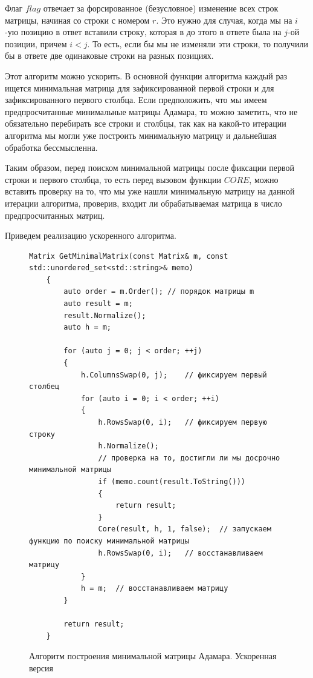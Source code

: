 \documentclass[a4paper, 14pt]{extreport}
\begin{document}
Флаг $flag$ отвечает за форсированное (безусловное) изменение всех строк матрицы, начиная со строки с номером $r$. Это нужно для случая, когда мы на $i$-ую позицию в ответ вставили строку, которая в до этого в ответе была на $j$-ой позиции, причем $i < j$. То есть, если бы мы не изменяли эти строки, то получили бы в ответе две одинаковые строки на разных позициях.

Этот алгоритм можно ускорить. В основной функции алгоритма каждый раз ищется минимальная матрица для зафиксированной первой строки и для зафиксированного первого столбца. Если предположить, что мы имеем предпросчитанные минимальные матрицы Адамара, то можно заметить, что не обязательно перебирать все строки и столбцы, так как на какой-то итерации алгоритма мы могли уже построить минимальную матрицу и дальнейшая обработка бессмысленна.

Таким образом, перед поиском минимальной матрицы после фиксации первой строки и первого столбца, то есть перед вызовом функции $CORE$, можно вставить проверку на то, что мы уже нашли минимальную матрицу на данной итерации алгоритма, проверив, входит ли обрабатываемая матрица в число предпросчитанных матриц.

Приведем реализацию ускоренного алгоритма.

\begin{figure}[H]
    \centering
    \begin{minipage}{\linewidth}
    \begin{lstlisting}[language=С++, tabsize=4, showspaces=false, basicstyle=\fontsize{9.5}{8.0}\selectfont, numbers=none]
    Matrix GetMinimalMatrix(const Matrix& m, const std::unordered_set<std::string>& memo)
    {
        auto order = m.Order(); // порядок матрицы m
        auto result = m;
        result.Normalize();
        auto h = m;
    
        for (auto j = 0; j < order; ++j)
        {
            h.ColumnsSwap(0, j);    // фиксируем первый столбец
            for (auto i = 0; i < order; ++i)
            {
                h.RowsSwap(0, i);   // фиксируем первую строку
                h.Normalize();
                // проверка на то, достигли ли мы досрочно минимальной матрицы
                if (memo.count(result.ToString()))
                {
                    return result;
                }
                Core(result, h, 1, false);  // запускаем функцию по поиску минимальной матрицы
                h.RowsSwap(0, i);   // восстанавливаем матрицу
            }
            h = m;  // восстанавливаем матрицу
        }
    
        return result;
    }
    \end{lstlisting}
    \end{minipage}
    \caption{Алгоритм построения минимальной матрицы Адамара. Ускоренная версия}
    \label{alg:mm_finder_main_acc}
\end{figure}
\end{document}
